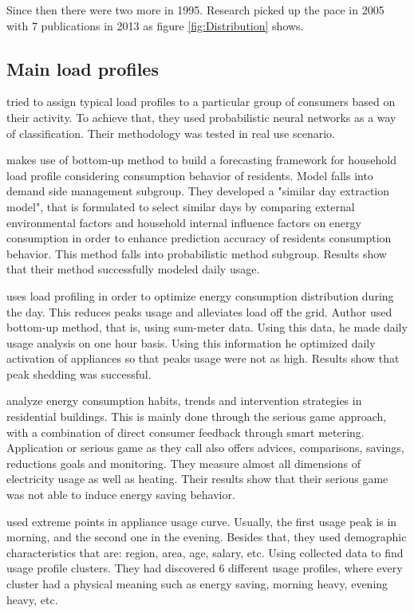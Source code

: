 \documentclass[
11pt, %
english, %
singlespacing, %
headsepline, %
]{MastersDoctoralThesis} %
\begin{document}
Since then there were two more in 1995. Research picked up the pace in 2005 with 7 publications in 2013 as figure \ref{fig:Distribution} shows.

\subsection{Main load profiles}


\cite{GERBEC2005} tried to assign typical load profiles to a particular group of consumers based on their activity. 
To achieve that, they used probabilistic neural networks as a way of classification. Their methodology was tested in real use scenario. 

\cite{Gao2018} makes use of bottom-up method to build a forecasting framework for household
load profile considering consumption behavior of residents. Model falls into demand side management subgroup.
They developed a "similar day extraction model",
that is formulated to select similar days by comparing external environmental factors and household internal 
influence factors on energy consumption in order to enhance prediction accuracy of residents consumption behavior.
This method falls into probabilistic method subgroup. Results show that their method successfully modeled daily usage.

\cite{Chuan2014} uses load profiling in order to optimize energy consumption distribution during the day.
This reduces peaks usage and alleviates load off the grid. Author used bottom-up method, that is, using sum-meter data.
Using this data, he made daily usage analysis on one hour basis. Using this information he optimized daily activation of appliances
so that peaks usage were not as high. Results show that peak shedding was successful. 

\cite{Csoknyai2019} analyze energy consumption habits, trends and intervention strategies in residential buildings.
This is mainly done through the serious game approach, with a combination of direct consumer feedback through smart metering.
Application or serious game as they call also offers advices, comparisons, savings, reductions goals and monitoring.
They measure almost all dimensions of electricity usage as well as heating. Their results show that their serious game was
not able to induce energy saving behavior.

\cite{Jeong2021} used extreme points in appliance usage curve.
Usually, the first usage peak is in morning, and the second one in the evening. 
Besides that, they used demographic characteristics that are: region, area, age, salary, etc. 
Using collected data to find usage profile clusters. They had discovered  6 different usage profiles, 
where every cluster had a physical meaning such as energy saving, morning heavy, evening heavy, etc.
\end{document}
